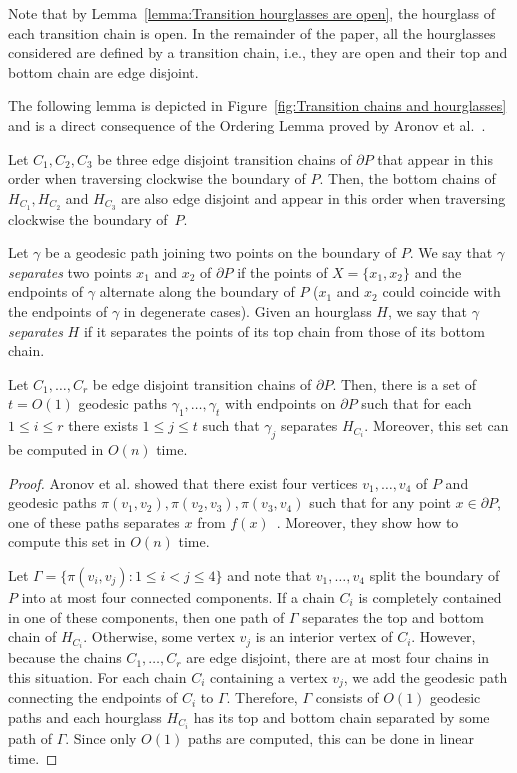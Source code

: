 \documentclass[a4paper,UKenglish]{lipics}
\newcommand{\ff}[1]{\ensuremath{f(#1)}}
\newcommand{\p}[2]{\ensuremath{\pi(#1, #2)}}
\begin{document}
Note that by Lemma~\ref{lemma:Transition hourglasses are open}, the hourglass of each transition chain is open.
In the remainder of the paper, all the hourglasses considered are defined by a transition chain, i.e., they are open and their top and bottom chain are edge disjoint.

The following lemma is depicted in Figure~\ref{fig:Transition chains and hourglasses} and is a direct consequence of the Ordering Lemma proved by Aronov et al.~\cite[Corollary 2.7.4]{aronov1993furthest}.
\begin{lemma}\label{lemma:Ordering Lemma}
Let $C_1, C_2, C_3$ be three edge disjoint transition chains of $\partial P$ that appear in this order when traversing clockwise the boundary of $P$. Then, the bottom chains of $H_{C_1}, H_{C_2}$ and $H_{C_3}$ are also edge disjoint and appear in this order when traversing clockwise the boundary of~$P$.
\end{lemma}

Let $\gamma$ be a  geodesic path joining two points on the boundary of $P$.
We say that $\gamma$ \emph{separates} two points $x_1$ and $x_2$ of $\partial P$ if the points of $X=\{x_1, x_2\}$ and the endpoints of $\gamma$ alternate along the boundary of $P$ ($x_1$ and $x_2$ could coincide with the endpoints of $\gamma$ in degenerate cases).
Given an hourglass $H$, we say that $\gamma$ \emph{separates} $H$ if it separates the points of its top chain from those of its  bottom chain.

\begin{lemma}\label{lemma:Split paths}
Let $C_1, \ldots, C_r$ be edge disjoint transition chains of $\partial P$. Then, there is a set of $t = O(1)$ geodesic paths $\gamma_1, \ldots, \gamma_t$ with endpoints on $\partial P$ such that for each $1\leq i\leq r$ there exists $1\leq j\leq t$ such that $\gamma_j$ separates $H_{C_i}$.
Moreover, this set can be computed in $O(n)$ time.
\end{lemma}
\begin{proof}
Aronov et al. showed that there exist four vertices $v_1, \ldots, v_4$ of $P$ and geodesic paths $\p{v_1}{v_2}, \p{v_2}{v_3}, \p{v_3}{v_4}$ such that for any point $x\in \partial P$, one of these paths separates $x$ from $\ff{x}$~\cite[Lemma 2.7.6]{aronov1993furthest}. Moreover, they show how to compute this set in $O(n)$ time.

Let $\Gamma= \{\p{v_i}{v_j} : 1\leq i < j\leq 4\}$ and note that $v_1, \ldots, v_4$ split the boundary of $P$ into at most four connected components.
If a chain $C_i$ is completely contained in one of these components, then one path of $\Gamma$ separates the top and bottom chain of $H_{C_i}$. Otherwise, some vertex $v_j$ is an interior vertex of $C_i$. However, because the chains $C_1, \ldots, C_r$ are edge disjoint, there are at most four chains in this situation. 
For each chain $C_i$ containing a vertex $v_j$, we add the geodesic path connecting the endpoints of $C_i$ to $\Gamma$.
Therefore, $\Gamma$ consists of $O(1)$ geodesic paths and each hourglass $H_{C_i}$ has its top and bottom chain separated by some path of $\Gamma$.
Since only $O(1)$ paths are computed, this can be done in linear time.
\end{proof}
\end{document}
